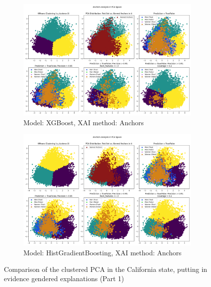 \begin{figure}[h]
    \centering
    \begin{subfigure}[b]{1.0\textwidth}
        \includegraphics[width=\textwidth]{Images/clustered_pca/clusters_xg_ca_anchors.png}
        \caption{Model: XGBoost, XAI method: Anchors}
    \end{subfigure}

    \begin{subfigure}[b]{1.0\textwidth}
        \includegraphics[width=\textwidth]{Images/clustered_pca/clusters_skrub_ca_anchors.png}
        \caption{Model: HistGradientBoosting, XAI method: Anchors}
        \label{fig:clusters_skrub_ca_anchors}
    \end{subfigure}
    \caption{Comparison of the clustered PCA in the California state, putting in evidence gendered explanations (Part 1)}
\end{figure}

